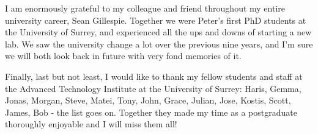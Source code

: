 \documentclass[../thesis/thesis.tex]{subfiles}
\begin{document}
I am enormously grateful to my colleague and friend throughout my entire university career, Sean Gillespie. Together we were Peter's first PhD students at the University of Surrey, and experienced all the ups and downs of starting a new lab. We saw the university change a lot over the previous nine years, and I'm sure we will both look back in future with very fond memories of it.

Finally, last but not least, I would like to thank my fellow students and staff at the Advanced Technology Institute at the University of Surrey: Haris, Gemma, Jonas, Morgan, Steve, Matei, Tony, John, Grace, Julian, Jose, Kostis, Scott, James, Bob - the list goes on. Together they made my time as a postgraduate thoroughly enjoyable and I will miss them all!

\newpage
\tableofcontents
{}

\newpage
{}
\listoffigures
\newpage
{}
\listoftables

\end{document}
